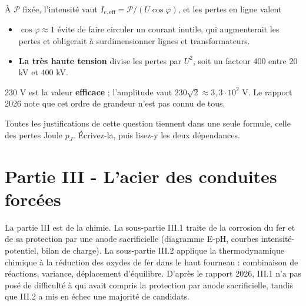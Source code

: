 \documentclass[11pt,a4paper]{article}
\providecommand{\tightlist}{\setlength{\itemsep}{0pt}\setlength{\parskip}{0pt}}
\newcommand{\equationajustee}[1]{%
  \sbox{\boiteequation}{$\displaystyle #1$}%
  \ifdim\wd\boiteequation>\linewidth
    \[\resizebox{\linewidth}{!}{\usebox{\boiteequation}}\]%
  \else
    \[#1\]%
  \fi}
\begin{document}
\equationajustee{\boxed{\mathscr P=U_{e,\text{eff}}I_{e,\text{eff}}\cos\varphi}}

À \(\mathscr P\) fixée, l'intensité vaut \(I_{e,\text{eff}}=\mathscr P/(U\cos\varphi)\), et les pertes en ligne valent

\equationajustee{p_J=R_{\text{ligne}}\frac{\mathscr P^2}{U^2\cos^2\varphi}.}

\begin{itemize}
\tightlist
\item
  \textbf{\(\cos\varphi\approx1\)} évite de faire circuler un courant inutile, qui augmenterait les pertes et obligerait à surdimensionner lignes et transformateurs.
\item
  \textbf{La très haute tension} divise les pertes par \(U^2\), soit un facteur 400 entre 20 kV et 400 kV.
\end{itemize}

\begin{piege}

230 V est la valeur \textbf{efficace} ; l'amplitude vaut \(230\sqrt2\approx3{,}3\cdot10^2\) V. Le rapport 2026 note que cet ordre de grandeur n'est pas connu de tous.

\end{piege}

\begin{methode}

Toutes les justifications de cette question tiennent dans une seule formule, celle des pertes Joule \(p_J\). Écrivez-la, puis lisez-y les deux dépendances.

\end{methode}

\hypertarget{partie-iii---lacier-des-conduites-forcuxe9es}{%
\section{Partie III - L'acier des conduites forcées}\label{partie-iii---lacier-des-conduites-forcuxe9es}}

La partie III est de la chimie. La sous-partie III.1 traite de la corrosion du fer et de sa protection par une anode sacrificielle (diagramme E-pH, courbes intensité-potentiel, bilan de charge). La sous-partie III.2 applique la thermodynamique chimique à la réduction des oxydes de fer dans le haut fourneau : combinaison de réactions, variance, déplacement d'équilibre. D'après le rapport 2026, III.1 n'a pas posé de difficulté à qui avait compris la protection par anode sacrificielle, tandis que III.2 a mis en échec une majorité de candidats.
\end{document}

